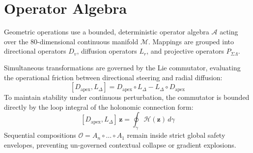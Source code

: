 \section{Operator Algebra}
\label{sec:operator-algebra}

Geometric operations use a bounded, 
deterministic operator algebra $\mathcal{A}$ 
acting over the 80-dimensional continuous 
manifold $\mathcal{M}$. Mappings are grouped 
into directional operators $D_v$, diffusion 
operators $L_r$, and projective 
operators $P_{\Sigma\Lambda}$.

Simultaneous transformations are 
governed by the Lie commutator, evaluating 
the operational friction between 
directional steering and radial diffusion:
\[
[D_{\mathrm{apex}}, L_{\Delta}]
= D_{\mathrm{apex}} \circ L_{\Delta} 
- L_{\Delta} \circ D_{\mathrm{apex}}
\]
To maintain stability under continuous 
perturbation, the commutator is 
bounded directly by the loop integral of 
the holonomic connection form:
\[
[D_{\mathrm{apex}}, L_{\Delta}]\,\mathbf{z} 
= \oint_{\gamma} 
\mathcal{H}(\mathbf{z}) \, d\gamma
\]
Sequential compositions 
$\mathcal{O} = A_n \circ \dots \circ A_1$ 
remain inside strict global safety 
envelopes, preventing un-governed 
contextual collapse or gradient explosions.
